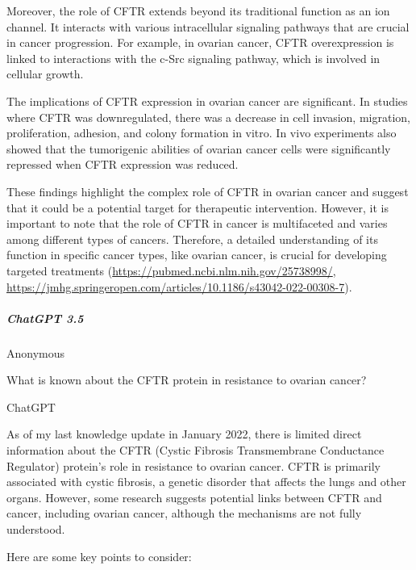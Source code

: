 Moreover, the role of CFTR extends beyond its traditional function as an ion channel. It interacts with various intracellular signaling pathways that are crucial in cancer progression. For example, in ovarian cancer, CFTR overexpression is linked to interactions with the c-Src signaling pathway, which is involved in cellular growth.

The implications of CFTR expression in ovarian cancer are significant. In studies where CFTR was downregulated, there was a decrease in cell invasion, migration, proliferation, adhesion, and colony formation in vitro. In vivo experiments also showed that the tumorigenic abilities of ovarian cancer cells were significantly repressed when CFTR expression was reduced.

These findings highlight the complex role of CFTR in ovarian cancer and suggest that it could be a potential target for therapeutic intervention. However, it is important to note that the role of CFTR in cancer is multifaceted and varies among different types of cancers. Therefore, a detailed understanding of its function in specific cancer types, like ovarian cancer, is crucial for developing targeted treatments\hspace{0pt}\hspace{0pt}\hspace{0pt}\hspace{0pt} (\url{https://pubmed.ncbi.nlm.nih.gov/25738998/}, \url{https://jmhg.springeropen.com/articles/10.1186/s43042-022-00308-7}).

\hypertarget{chatgpt-3.5}{%
\subparagraph{ChatGPT 3.5}\label{chatgpt-3.5}}

Anonymous

What is known about the CFTR protein in resistance to ovarian cancer?

ChatGPT

As of my last knowledge update in January 2022, there is limited direct information about the CFTR (Cystic Fibrosis Transmembrane Conductance Regulator) protein's role in resistance to ovarian cancer. CFTR is primarily associated with cystic fibrosis, a genetic disorder that affects the lungs and other organs. However, some research suggests potential links between CFTR and cancer, including ovarian cancer, although the mechanisms are not fully understood.

Here are some key points to consider:

